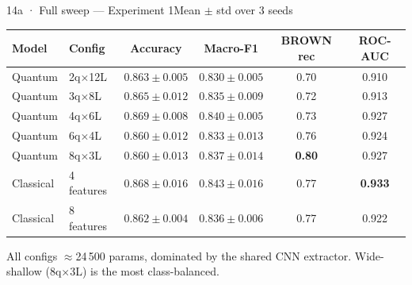 \begin{frame}{14a · Full sweep --- Experiment 1}{Mean $\pm$ std over 3 seeds}
    \centering\footnotesize
    \setlength{\tabcolsep}{4pt}
    \begin{tabular}{llcccc}
        \toprule
        Model     & Config        & Accuracy        & Macro-F1        & BROWN rec     & ROC-AUC        \\
        \midrule
        Quantum   & 2q$\times$12L & $0.863\pm0.005$ & $0.830\pm0.005$ & 0.70          & 0.910          \\
        Quantum   & 3q$\times$8L  & $0.865\pm0.012$ & $0.835\pm0.009$ & 0.72          & 0.913          \\
        Quantum   & 4q$\times$6L  & $0.869\pm0.008$ & $0.840\pm0.005$ & 0.73          & 0.927          \\
        Quantum   & 6q$\times$4L  & $0.860\pm0.012$ & $0.833\pm0.013$ & 0.76          & 0.924          \\
        Quantum   & 8q$\times$3L  & $0.860\pm0.013$ & $0.837\pm0.014$ & \textbf{0.80} & 0.927          \\
        Classical & 4 features    & $0.868\pm0.016$ & $0.843\pm0.016$ & 0.77          & \textbf{0.933} \\
        Classical & 8 features    & $0.862\pm0.004$ & $0.836\pm0.006$ & 0.77          & 0.922          \\
        \bottomrule
    \end{tabular}
    \par\vspace{6pt}
    {\scriptsize\color{zhawgrey}All configs $\approx$24\,500 params, dominated by the
        shared CNN extractor. Wide-shallow (8q$\times$3L) is the most class-balanced.}
\end{frame}

